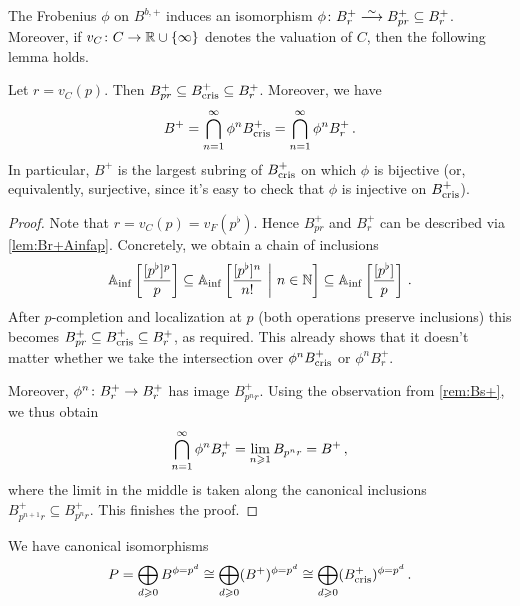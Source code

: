 The Frobenius $\phi$ on $B^{b,+}$ induces an isomorphism $\phi\colon B_r^+\isomorphism B_{pr}^+\subseteq B_r^+$. Moreover, if $v_C\colon C\morphism \IR\cup\{\infty\}$ denotes the valuation of $C$, then the following lemma holds.
\begin{lem}\label{lem:B+}
	Let $r=v_C(p)$. Then $B_{pr}^+\subseteq B_{\mathrm{cris}}^+\subseteq B_r^+$. Moreover, we have
	\begin{equation*}
		B^+=\bigcap_{n=1}^\infty \phi^nB_\cris^+=\bigcap_{n=1}^\infty \phi^nB_r^+\,.
	\end{equation*}
	In particular, $B^+$ is the largest subring of $B_{\mathrm{cris}}^+$ on which $\phi$ is bijective (or, equivalently, surjective, since it's easy to check that $\phi$ is injective on $B_{\mathrm{cris}}^+$).
\end{lem}
\begin{proof}
	Note that $r=v_C(p)=v_F(p^\flat)$. Hence $B_{pr}^+$ and $B_r^+$ can be described via \cref{lem:Br+Ainfap}. Concretely, we obtain a chain of inclusions
	\begin{equation*}
		\mathbb{A}_{\mathrm{inf}}\left[\frac{[p^\flat]^p}{p}\right]\subseteq \mathbb{A}_{\mathrm{inf}}\left[\frac{[p^\flat]^n}{n!}\ \middle|\  n\in\mathbb{N}\right]\subseteq \mathbb{A}_{\mathrm{inf}}\left[\frac{[p^\flat]}{p}\right]\,.
	\end{equation*}
	After $p$-completion and localization at $p$ (both operations preserve inclusions) this becomes $B_{pr}^+\subseteq B_{\mathrm{cris}}^+\subseteq B_r^+$, as required. This already shows that it doesn't matter whether we take the intersection over $\phi^nB_\cris^+$ or $\phi^nB_r^+$.
	
	Moreover, $\phi^n\colon B_r^+\morphism B_r^+$ has image $B_{p^nr}^+$. Using the observation from \cref{rem:Bs+}, we thus obtain
	\begin{equation*}
		\bigcap_{n=1}^\infty\phi^nB_r^+=\limit_{n\geq 1}B_{p^nr}=B^+\,,
	\end{equation*}
	where the limit in the middle is taken along the canonical inclusions $B_{p^{n+1}r}^+\subseteq B_{p^nr}^+$. This finishes the proof.
\end{proof}
\begin{prop}\label{prop:FFandBcris}
	We have canonical isomorphisms
	\begin{equation*}
		P=\bigoplus_{d\geq 0}B^{\phi=p^d}\cong \bigoplus_{d\geq 0}(B^+)^{\phi=p^d}\cong \bigoplus_{d\geq 0} (B_\cris^+)^{\phi=p^d}\,.
	\end{equation*}
\end{prop}
